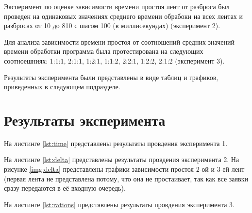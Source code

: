 Эксперимент по оценке зависимости времени простоя лент от разброса был проведен
на одинаковых значениях среднего времени обрабоки на всех лентах и разбросах от
10 до 810 с шагом 100 (в миллисекундах) (эксперимент 2).

Для анализа зависимости времени простоя от соотношений средних значений времени
обработки программа была протестирована на следующих соотноешниях: 1:1:1,
2:1:1, 1:2:1, 1:1:2, 2:2:1, 1:2:2, 2:1:2 (эксперимент 3).

Результаты эксперимента были представлены в виде таблиц и графиков, приведенных
в следующем подразделе.

\section{Результаты эксперимента}

На листинге \ref{lst:time} представлены результаты провдения эксперимента 1.

На листинге \ref{lst:delta} представлены результаты провдения эксперимента 2.
На рисунке \ref{img:delta} представлены графики зависимости простоя 2-ой и 3-ей
лент (первая лента не представлена потому, что она не простаивает, так как все
заявки сразу передаются в её входную очередь).


На листинге \ref{lst:rations} представлены результаты провдения эксперимента 3.


\begin{mdlisting}
    \captionsetup{justification=raggedright,singlelinecheck=off}
    
\end{mdlisting}

\begin{mdlisting}
    \captionsetup{justification=raggedright,singlelinecheck=off}
    
\end{mdlisting}

